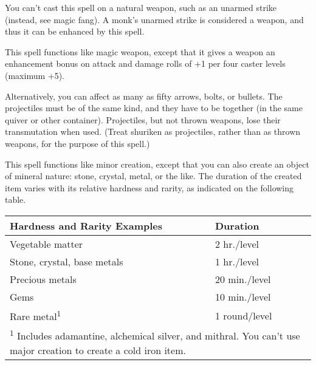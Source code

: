 \begin{multicols}{2}
\begin{small}
\smallskip\noindent You can't cast this spell on a natural weapon, such as an unarmed strike (instead, see magic fang). A monk's unarmed strike is considered a weapon, and thus it can be enhanced by this spell.

\noindent This spell functions like magic weapon, except that it gives a weapon an enhancement bonus on attack and damage rolls of +1 per four caster levels (maximum +5).

\smallskip\noindent Alternatively, you can affect as many as fifty arrows, bolts, or bullets. The projectiles must be of the same kind, and they have to be together (in the same quiver or other container). Projectiles, but not thrown weapons, lose their transmutation when used. (Treat shuriken as projectiles, rather than as thrown weapons, for the purpose of this spell.)


\noindent This spell functions like minor creation, except that you can also create an object of mineral nature: stone, crystal, metal, or the like. The duration of the created item varies with its relative hardness and rarity, as indicated on the following table.
 
\begin{center}
\begin{tabular}[h!]{l|l}
Hardness and Rarity Examples & Duration \\ \hline
Vegetable matter & 2 hr./level \\
Stone, crystal, base metals & 1 hr./level \\
Precious metals & 20 min./level \\
Gems & 10 min./level \\
Rare metal\textsuperscript{1} & 1 round/level \\
\multicolumn{2}{p{3in}}{\textsuperscript{1} Includes adamantine, alchemical silver, and mithral. You can't use major creation to create a cold iron item.}
\end{tabular}
\end{center}


\end{small}
\end{multicols}
